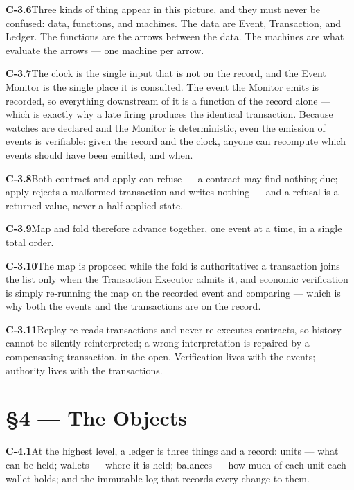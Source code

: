 \documentclass[11pt,a4paper]{article}
\newcommand{\clause}[2]{\par\medskip\noindent\textbf{#1}\hspace{0.6em}#2}
\begin{document}
\clause{C-3.6}{Three kinds of thing appear in this picture, and they must never be
confused: data, functions, and machines. The data are Event, Transaction, and
Ledger. The functions are the arrows between the data. The machines are what
evaluate the arrows --- one machine per arrow.}

\clause{C-3.7}{The clock is the single input that is not on the record, and the
Event Monitor is the single place it is consulted. The event the Monitor emits is
recorded, so everything downstream of it is a function of the record alone ---
which is exactly why a late firing produces the identical transaction. Because
watches are declared and the Monitor is deterministic, even the emission of events
is verifiable: given the record and the clock, anyone can recompute which events
should have been emitted, and when.}

\clause{C-3.8}{Both contract and apply can refuse --- a contract may find nothing
due; apply rejects a malformed transaction and writes nothing --- and a refusal is
a returned value, never a half-applied state.}

\clause{C-3.9}{Map and fold therefore advance together, one event at a time, in a
single total order.}

\clause{C-3.10}{The map is proposed while the fold is authoritative: a transaction
joins the list only when the Transaction Executor admits it, and economic
verification is simply re-running the map on the recorded event and comparing ---
which is why both the events and the transactions are on the record.}

\clause{C-3.11}{Replay re-reads transactions and never re-executes contracts, so
history cannot be silently reinterpreted; a wrong interpretation is repaired by a
compensating transaction, in the open. Verification lives with the events;
authority lives with the transactions.}

\section*{\S4 --- The Objects}

\clause{C-4.1}{At the highest level, a ledger is three things and a record: units
--- what can be held; wallets --- where it is held; balances --- how much of each
unit each wallet holds; and the immutable log that records every change to them.}
\end{document}
